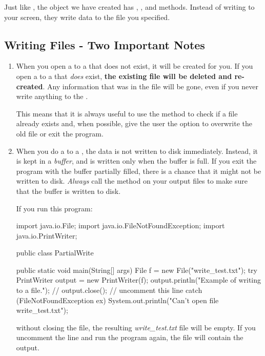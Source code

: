 Just like , the  object  we have created has , , and  methods. Instead of writing to your screen, they write data to the file you specified.

\subsection {Writing Files - Two Important Notes}

\begin{enumerate}
\item When you open a  to a  that does not exist, it will be created for you. If you open a  to a  that {\em does} exist, {\bf the existing file will be deleted and re-created}. Any information that was in the file will be gone, even if you never write anything to the .

This means that it is always useful to use the  method to check if a file already exists and, when possible, give the user the option to overwrite the old file or exit the program.

\item When you do a  to a , the data is not written to disk immediately. Instead, it is kept in a {\em buffer}, and is written only when the buffer is full. If you exit the program with the buffer partially filled, there is a chance that it might not be written to disk. {\em Always} call the  method on your output files to make sure that the buffer is written to disk.

If you run this program:

\begin{code}
import java.io.File;
import java.io.FileNotFoundException;
import java.io.PrintWriter;

public class PartialWrite {

    public static void main(String[] args) {        
        File f = new File("write_test.txt");
        try {
            PrintWriter output = new PrintWriter(f);
            output.println("Example of writing to a file.");
            // output.close(); // uncomment this line 
        }
        catch (FileNotFoundException ex) {
            System.out.println("Can't open file write_test.txt");
        }
    }
}
\end{code}

without closing the file, the resulting {\em write\_test.txt} file will be empty.
If you uncomment the  line and run the program again, the file will contain the output.
 
\end{enumerate}

